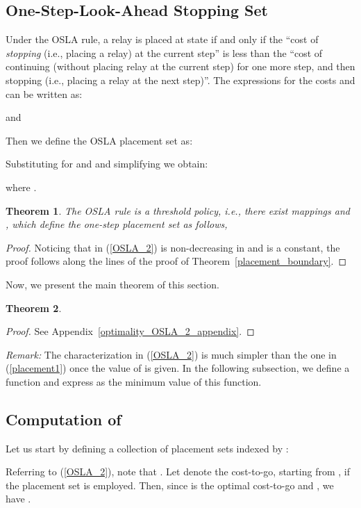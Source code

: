 \documentclass[conference]{IEEEtran}
\newtheorem{theorem}{Theorem}
\begin{document}
\subsection{One-Step-Look-Ahead Stopping Set
  }
Under the OSLA rule, a relay is placed at state  if
and only if the ``cost  of \emph{stopping} (i.e., placing a
relay) at the current step'' is less than the ``cost  of
continuing (without placing relay at the current step) for one more
step, and then stopping (i.e., placing a relay at the next step)''. The
expressions for the costs  and  can be written as:

and

Then we define the OSLA placement set  as:

Substituting for  and  and simplifying we obtain:

where .
\begin{theorem} 
The OSLA rule is a threshold policy, i.e., there exist mappings  
 and  , 
which define the one-step placement set  as follows, 

\end{theorem}
\begin{proof}
  Noticing that in (\ref{OSLA_2})  is non-decreasing in
   and  is a constant, the proof
  follows along the lines of the proof of
  Theorem~\ref{placement_boundary}.
\end{proof}

Now, we present the main theorem of this section.
\begin{theorem} 
\label{optimality_OSLA_2}

\end{theorem}
\begin{proof}
See Appendix~\ref{optimality_OSLA_2_appendix}.
\end{proof}

\emph{Remark:} The characterization in (\ref{OSLA_2}) is much simpler than the one in (\ref{placement1}) 
once the value of  is given. In the following subsection, we define a function
  and express 
 as the minimum value of this function. 

\subsection{Computation of }
\label{calculation_cost_section}
Let us start by defining a collection of placement sets indexed by :

Referring to (\ref{OSLA_2}), note that . Let
 denote the cost-to-go, starting from , if the placement set  is employed. 
Then, since  is the optimal cost-to-go and 
, we have . 
\end{document}
